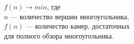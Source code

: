 \documentclass[preview]{standalone}
\begin{document}
\begin{center}
$f(n) \rightarrow min$, где\\$n$ — количество вершин многоугольника,\\$f(n)$ — количество камер, достаточных\\для полного обзора многоугольника.
\end{center}
\end{document}

